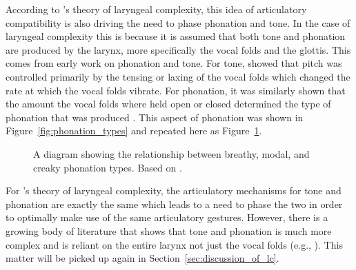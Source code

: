 According to \citeauthor{silvermanLaryngealComplexityOtomanguean1997}'s theory of laryngeal complexity, this idea of articulatory compatibility is also driving the need to phase phonation and tone. In the case of laryngeal complexity this is because it is assumed that both tone and phonation are produced by the larynx, more specifically the vocal folds and the glottis. This comes from early work on phonation and tone. For tone, \citet{ohalaProductionTone1978} showed that pitch was controlled primarily by the tensing or laxing of the vocal folds which changed the rate at which the vocal folds vibrate. For phonation, it was similarly shown that the amount the vocal folds where held open or closed determined the type of phonation that was produced \citep{ladefogedSoundsWorldsLanguages1996}. This aspect of phonation was shown in Figure~\ref{fig:phonation_types} and repeated here as Figure~\ref{fig:phonation_types_repeat}. 

\begin{figure}[h!]
    \centering
    \caption{A diagram showing the relationship between breathy, modal, and creaky phonation types. Based on \citet{gordonPhonationTypesCrosslinguistic2001}.}
    \label{fig:phonation_types_repeat}
\end{figure}

For \citeauthor{silvermanLaryngealComplexityOtomanguean1997}'s \citeyear{silvermanLaryngealComplexityOtomanguean1997} theory of laryngeal complexity, the articulatory mechanisms for tone and phonation are exactly the same which leads to a need to phase the two in order to optimally make use of the same articulatory gestures. However, there is a growing body of literature that shows that tone and phonation is much more complex and is reliant on the entire larynx not just the vocal folds (e.g., \cite{eslingVoiceQualityLaryngeal2019}). This matter will be picked up again in Section~\ref{sec:discussion_of_lc}.

